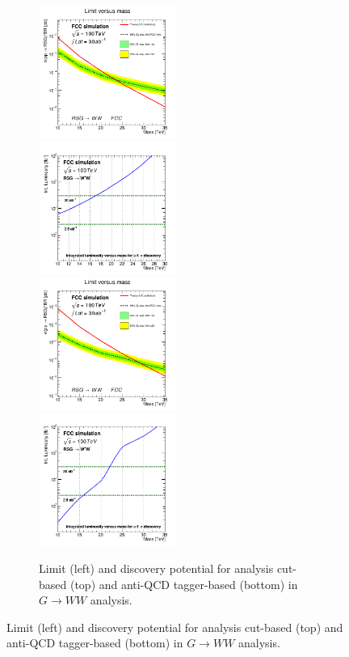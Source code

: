 \documentclass{cernrep}
\begin{document}
\begin{figure}[!htb]
\begin{figure}[!htb]\centering
\includegraphics[width=0.495\textwidth]{Fig/RSGww/cut/lim_RSGraviton_ww_fcc_v02.png}
\includegraphics[width=0.495\textwidth]{Fig/RSGww/cut/DiscoveryPotential_ww_rootStyle.png}
\includegraphics[width=0.495\textwidth]{Fig/RSGww/tagger/lim_RSGraviton_ww_fcc_v02.png}
\includegraphics[width=0.495\textwidth]{Fig/RSGww/tagger/DiscoveryPotential_ww_rootStyle.png}
\caption{Limit (left) and discovery potential for analysis cut-based (top) and anti-QCD tagger-based (bottom) in $G \rightarrow WW$ analysis.}
\label{fig:RSWww_limit}
\end{figure}


\end{figure}
\end{document}
